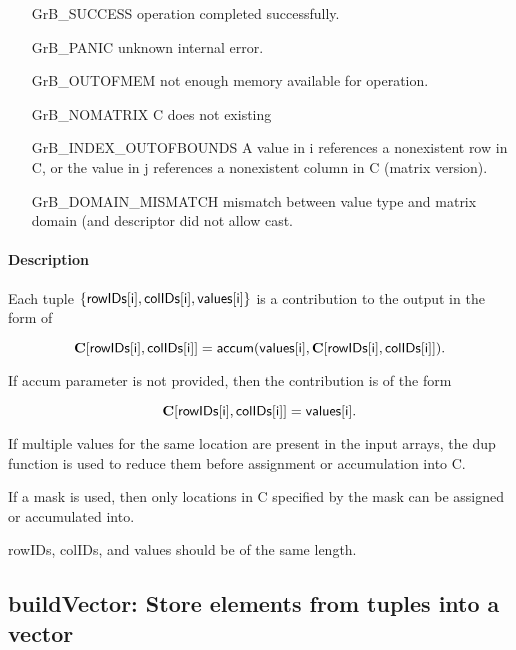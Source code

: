 \begin{itemize}[leftmargin=2.1in]
\item[{\sf GrB\_SUCCESS}]      operation completed successfully.
\item[{\sf GrB\_PANIC}]        unknown internal error.
\item[{\sf GrB\_OUTOFMEM}]     not enough memory available for operation.
\item[{\sf GrB\_NOMATRIX}]     C does not existing
\item[{\sf GrB\_INDEX\_OUTOFBOUNDS}]
        A value in i references a nonexistent row in C, or
        the value in j references a nonexistent column in C (matrix version).
\item[\sf GrB\_DOMAIN\_MISMATCH]  
       mismatch between value type and matrix domain (and descriptor did not allow cast.
\end{itemize}


\paragraph{Description}
Each tuple $\{ {\sf rowIDs[i]}, {\sf colIDs[i]}, {\sf values[i]}\}$ is a contribution to the output in the form of 

$${\bf C}[{\sf rowIDs[i]},{\sf colIDs[i]}] = {\sf accum}({\sf values[i]}, {\bf C}[{\sf rowIDs[i]}, {\sf colIDs[i]}]).$$

If {\sf accum} parameter is not provided, then the contribution is of the form 

$${\bf C}[{\sf rowIDs[i]}, {\sf colIDs[i]}] = {\sf values[i]}.$$

If multiple values for the same location are present in the input arrays, the 
dup function is used to reduce them before assignment or accumulation into {\sf C}.

If a mask is used, then only locations in {\sf C} specified by the mask can be assigned or
accumulated into.
 
{\sf rowIDs}, {\sf colIDs}, and {\sf values} should be of the same length. 

\subsection{{\sf buildVector}: Store elements from tuples into a vector}
\label{Sec:buildVector}

\paragraph{\syntax}

